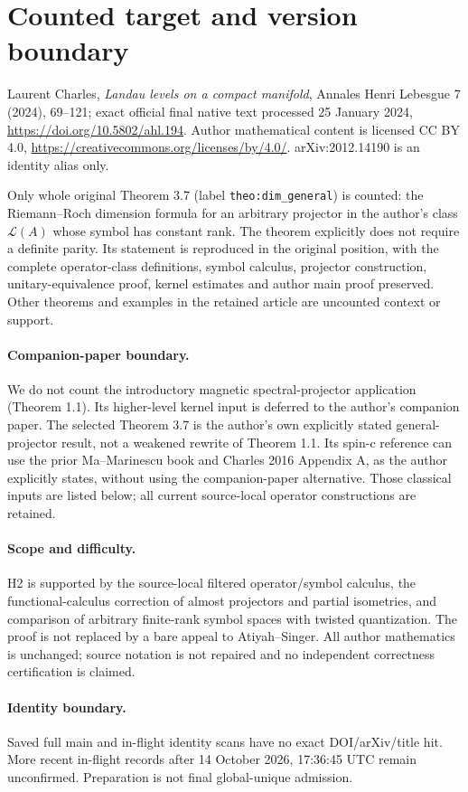 \section*{Counted target and version boundary}
Laurent Charles, \emph{Landau levels on a compact manifold}, Annales Henri Lebesgue 7 (2024), 69--121; exact official final native text processed 25 January 2024, \url{https://doi.org/10.5802/ahl.194}. Author mathematical content is licensed CC BY 4.0, \url{https://creativecommons.org/licenses/by/4.0/}. arXiv:2012.14190 is an identity alias only.

Only whole original Theorem 3.7 (label \texttt{theo:dim\_general}) is counted: the Riemann--Roch dimension formula for an arbitrary projector in the author's class $\mathcal L(A)$ whose symbol has constant rank. The theorem explicitly does not require a definite parity. Its statement is reproduced in the original position, with the complete operator-class definitions, symbol calculus, projector construction, unitary-equivalence proof, kernel estimates and author main proof preserved. Other theorems and examples in the retained article are uncounted context or support.

\paragraph{Companion-paper boundary.} We do not count the introductory magnetic spectral-projector application (Theorem 1.1). Its higher-level kernel input is deferred to the author's companion paper. The selected Theorem 3.7 is the author's own explicitly stated general-projector result, not a weakened rewrite of Theorem 1.1. Its spin-c reference can use the prior Ma--Marinescu book and Charles 2016 Appendix A, as the author explicitly states, without using the companion-paper alternative. Those classical inputs are listed below; all current source-local operator constructions are retained.

\paragraph{Scope and difficulty.} H2 is supported by the source-local filtered operator/symbol calculus, the functional-calculus correction of almost projectors and partial isometries, and comparison of arbitrary finite-rank symbol spaces with twisted quantization. The proof is not replaced by a bare appeal to Atiyah--Singer. All author mathematics is unchanged; source notation is not repaired and no independent correctness certification is claimed.

\paragraph{Identity boundary.} Saved full main and in-flight identity scans have no exact DOI/arXiv/title hit. More recent in-flight records after 14 October 2026, 17:36:45 UTC remain unconfirmed. Preparation is not final global-unique admission.

